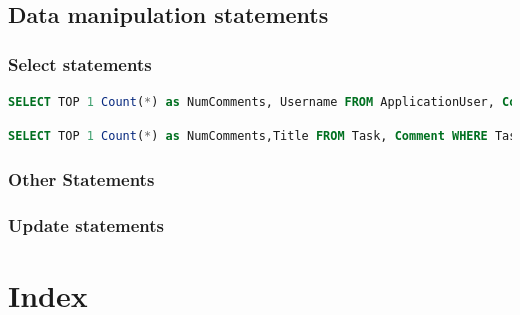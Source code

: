 \documentclass[letterpaper]{article}
\begin{document}
\pagebreak

\subsection{Data manipulation statements}

\subsubsection{Select statements}

\begin{lstlisting}[language=SQL, caption=Select Most Active Task by Number of Comments]
SELECT TOP 1 Count(*) as NumComments, Username FROM ApplicationUser, Comment WHERE ApplicationUser.Id=Comment.OwnerId GROUP BY Username ORDER BY NumComments desc;
\end{lstlisting}
\begin{lstlisting}[language=SQL, caption=Select Most Active User (Comments)]
SELECT TOP 1 Count(*) as NumComments,Title FROM Task, Comment WHERE Task.Id=Comment.TaskId GROUP BY Title ORDER BY NumComments desc;
\end{lstlisting}

\subsubsection{Other Statements}

\subsubsection{Update statements}

\section{Index}
\lstlistoflistings
\end{document}
